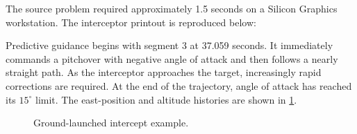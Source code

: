 The source problem required approximately 1.5 seconds on a Silicon Graphics
workstation.  The interceptor printout is reproduced below:

\begin{center}
\begin{minipage}{0.98\linewidth}

\end{minipage}
\end{center}

Predictive guidance begins with segment 3 at 37.059 seconds.  It immediately
commands a pitchover with negative angle of attack and then follows a nearly straight
path.  As the interceptor approaches the target, increasingly rapid corrections are
required.  At the end of the trajectory, angle of attack has reached its
$15^\circ$ limit.  The east-position and altitude histories are shown in
\cref{fig:example-ground-intercept}.

\begin{figure}[htbp]
  \centering
  \resizebox{0.84\linewidth}{!}{}
  \caption{Ground-launched intercept example.}
  \label{fig:example-ground-intercept}
\end{figure}
